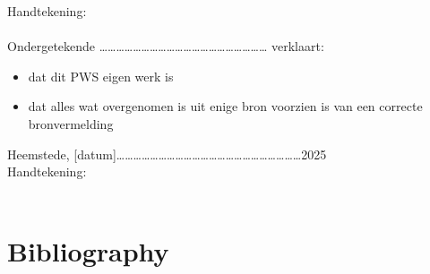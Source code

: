 \documentclass[a4paper,12pt,titlepage]{article}
\begin{document}
Handtekening: \\ \\

Ondergetekende …………………………………………………… verklaart:

\begin{itemize}
	\item{dat dit PWS eigen werk is}
	\item{dat alles wat overgenomen is uit enige bron voorzien is van een correcte bronvermelding}
\end{itemize}

Heemstede, [datum]…………………………………………………………2025 \\

Handtekening: \\ \\

\pagebreak
\section{Bibliography}
\nocite{*}
\printbibliography
\end{document}
